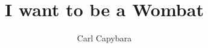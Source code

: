 \documentclass{report}
\begin{document}
\title{I want to be a Wombat}
\author{Carl Capybara}
\maketitle
\end{document}
